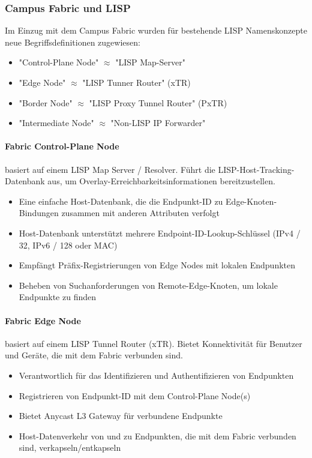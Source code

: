 \subsubsection{Campus Fabric und LISP}
Im Einzug mit dem Campus Fabric wurden für bestehende LISP Namenskonzepte neue Begriffsdefinitionen zugewiesen:
\begin{itemize}
	\item "Control-Plane Node" $\approx$ "LISP Map-Server"
	\item "Edge Node" $\approx$ "LISP Tunner Router" (xTR)
	\item "Border Node" $\approx$ "LISP Proxy Tunnel Router" (PxTR)
	\item "Intermediate Node" $\approx$ "Non-LISP IP Forwarder"
\end{itemize}

\paragraph{Fabric Control-Plane Node} basiert auf einem LISP Map Server / Resolver. Führt die LISP-Host-Tracking-Datenbank aus, um Overlay-Erreichbarkeitsinformationen bereitzustellen.
\begin{itemize}
	\item Eine einfache Host-Datenbank, die die Endpunkt-ID zu Edge-Knoten-Bindungen zusammen mit anderen Attributen verfolgt
	\item Host-Datenbank unterstützt mehrere Endpoint-ID-Lookup-Schlüssel (IPv4 / 32, IPv6 / 128 oder MAC)
	\item Empfängt Präfix-Registrierungen von Edge Nodes mit lokalen Endpunkten
	\item Beheben von Suchanforderungen von Remote-Edge-Knoten, um lokale Endpunkte zu finden
\end{itemize}

\paragraph{Fabric Edge Node} basiert auf einem LISP Tunnel Router (xTR). Bietet Konnektivität für Benutzer und Geräte, die mit dem Fabric verbunden sind.
\begin{itemize}
	\item Verantwortlich für das Identifizieren und Authentifizieren von Endpunkten
	\item Registrieren von Endpunkt-ID mit dem Control-Plane Node(s)
	\item Bietet Anycast L3 Gateway für verbundene Endpunkte
	\item Host-Datenverkehr von und zu Endpunkten, die mit dem Fabric verbunden sind, verkapseln/entkapseln
\end{itemize}

